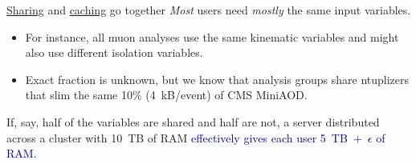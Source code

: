 \documentclass{beamer}
\begin{document}
\begin{frame}{\underline{Sharing} and \underline{caching} go together}
\vspace{0.25 cm}
{\it Most} users need {\it mostly} the same input variables.
\begin{itemize}
\item For instance, all muon analyses use the same kinematic variables and might also use different isolation variables.
\item Exact fraction is unknown, but we know that analysis groups share ntuplizers that slim the same 10\% (4~kB/event) of CMS MiniAOD.
\end{itemize}









\vspace{0.5 cm}
If, say, half of the variables are shared and half are not, a server distributed across a cluster with 10~TB of RAM \textcolor{darkblue}{effectively gives each user 5~TB~$+$~$\epsilon$ of RAM.}
\end{frame}
\end{document}
